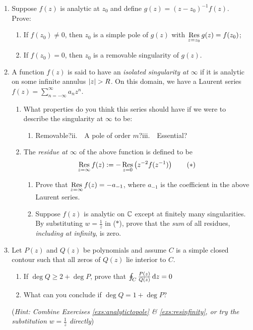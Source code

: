 \begin{exercises}
\begin{enumerate}
		
		\item\label{exs:analytictopole} Suppose $f(z)$ is analytic at $z_0$ and define $g(z)=(z-z_0)^{-1}f(z)$. Prove:
		\begin{enumerate}
		  \item If $f(z_0)\neq 0$, then $z_0$ is a simple pole of $g(z)$ with $\operatorname*{Res}\limits_{z=z_0}g(z)=f(z_0)$;
		  
		  \item If $f(z_0)= 0$, then $z_0$ is a removable singularity of $g(z)$.
		\end{enumerate}
		
		
		\item\label{exs:resinfinity} A function $f(z)$ is said to have an \emph{isolated singularity at $\infty$} if it is analytic on some infinite annulus $\nm{z}>R$. On this domain, we have a Laurent series $f(z)=\sum_{n=-\infty}^\infty a_nz^n$.
		\begin{enumerate}
		  \item What properties do you think this series should have if we were to describe the singularity at $\infty$ to be:
		  \begin{enumerate}
		    \item Removable?\qquad ii.\ \ A pole of order $m$?\qquad iii.\ \ Essential?
		  \end{enumerate}
	
		  \item The \emph{residue at $\infty$} of the above function is defined to be
		\[
			\operatorname*{Res}_{z=\infty}f(z):=-\operatorname*{Res}_{z=0}\left(z^{-2}f(z^{-1})\right) \tag{$\ast$}
		\]
		 	\begin{enumerate}
		    \item Prove that $\operatorname*{Res}\limits_{z=\infty}f(z)=-a_{-1}$, where $a_{-1}$ is the coefficient in the above Laurent series.%
	
		    \item Suppose $f(z)$ is analytic on $\mathbb{C}$ except at finitely many singularities. By substituting $w=\frac 1z$ in ($\ast$), prove that the \emph{sum} of all residues, \emph{including at infinity}, is zero.
		  \end{enumerate}
		\end{enumerate}
	
		
		\item Let $P(z)$ and $Q(z)$ be polynomials and assume $C$ is a simple closed contour such that all zeros of $Q(z)$ lie interior to $C$.
		\begin{enumerate}
		  \item If $\deg Q\ge 2+\deg P$, prove that $\oint_C\frac{P(z)}{Q(z)}\,{\mathrm{d} z}=0$
			
			\item What can you conclude if $\deg Q=1+\deg P$?
		\end{enumerate}
		(\emph{Hint: Combine Exercises \ref*{exs:analytictopole} \& \ref*{exs:resinfinity}, or try the substitution $w=\frac 1z$ directly})

	\end{enumerate}
\end{exercises}


